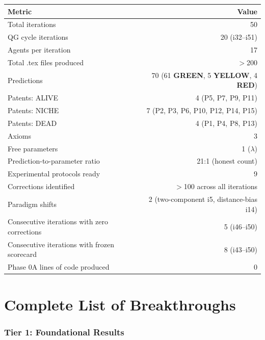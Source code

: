 \documentclass[11pt,a4paper]{article}
\newcommand{\GREEN}{\textcolor{dfdgreen}{\textbf{GREEN}}}
\newcommand{\YELLOW}{\textcolor{dfdyellow}{\textbf{YELLOW}}}
\newcommand{\RED}{\textcolor{dfdred}{\textbf{RED}}}
\begin{document}
\begin{center}
\begin{tabular}{lr}
\toprule
\textbf{Metric} & \textbf{Value} \\
\midrule
Total iterations & 50 \\
QG cycle iterations & 20 (i32--i51) \\
Agents per iteration & 17 \\
Total .tex files produced & $>$200 \\
Predictions & 70 (61 \GREEN, 5 \YELLOW, 4 \RED) \\
Patents: ALIVE & 4 (P5, P7, P9, P11) \\
Patents: NICHE & 7 (P2, P3, P6, P10, P12, P14, P15) \\
Patents: DEAD & 4 (P1, P4, P8, P13) \\
Axioms & 3 \\
Free parameters & 1 ($\lambda$) \\
Prediction-to-parameter ratio & 21:1 (honest count) \\
Experimental protocols ready & 9 \\
Corrections identified & $>$100 across all iterations \\
Paradigm shifts & 2 (two-component i5, distance-bias i14) \\
Consecutive iterations with zero corrections & 5 (i46--i50) \\
Consecutive iterations with frozen scorecard & 8 (i43--i50) \\
Phase 0A lines of code produced & 0 \\
\bottomrule
\end{tabular}
\end{center}


\part{Complete List of Breakthroughs}
\label{part:breakthroughs}

\section{Tier 1: Foundational Results}
\end{document}
